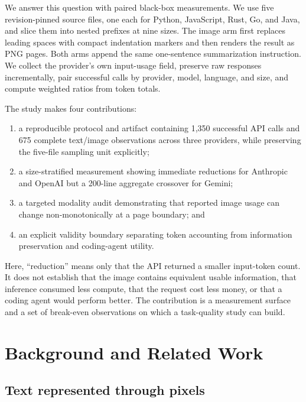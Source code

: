 \documentclass[sigconf,nonacm]{acmart}
\begin{document}
We answer this question with paired black-box measurements. We use five
revision-pinned source files, one each for Python, JavaScript, Rust, Go, and
Java, and slice them into nested prefixes at nine sizes. The image arm first replaces leading
spaces with compact indentation markers and then renders the result as PNG
pages. Both arms append the same one-sentence summarization instruction. We
collect the provider's own input-usage field, preserve raw responses
incrementally, pair successful calls by provider, model, language, and size,
and compute weighted ratios from token totals.

The study makes four contributions:

\begin{enumerate}[leftmargin=*,nosep]
  \item a reproducible protocol and artifact containing 1,350 successful API
  calls and 675 complete text/image observations across three providers, while
  preserving the five-file sampling unit explicitly;
  \item a size-stratified measurement showing immediate reductions for
  Anthropic and OpenAI but a 200-line aggregate crossover for Gemini;
  \item a targeted modality audit demonstrating that reported image usage can
  change non-monotonically at a page boundary; and
  \item an explicit validity boundary separating token accounting from
  information preservation and coding-agent utility.
\end{enumerate}

Here, ``reduction'' means only that the API returned a smaller input-token
count. It does not establish that the
image contains equivalent usable information, that inference consumed less
compute, that the request cost less money, or that a coding agent would perform
better. The contribution is a measurement surface and a set of break-even
observations on which a task-quality study can build.

\section{Background and Related Work}

\subsection{Text represented through pixels}
\end{document}
